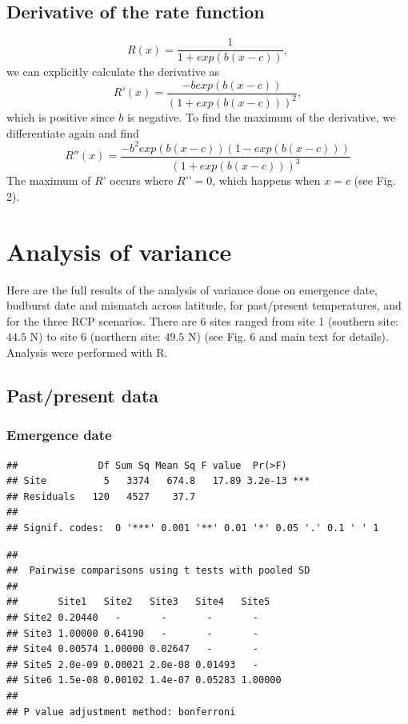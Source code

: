 \documentclass[12 pt]{article}
\begin{document}
\subsection*{Derivative of the rate function}
\begin{equation}
    R(x)=\frac{1}{1+exp(b(x-c))}, \tag*{Eq. S\theequation}
\end{equation}
we can explicitly calculate the derivative as
\begin{equation}
    R'(x)=\frac{-b exp(b(x-c))}{(1+exp(b(x-c)))^2}, \tag*{Eq. S\theequation}
\end{equation}
which is positive since $b$ is negative. To find the maximum of the derivative, we differentiate again and find
\begin{equation}
    R''(x) = \frac{-b^2 exp(b(x-c))(1-exp(b(x-c)))}{(1+exp(b(x-c)))^3} \tag*{Eq. S\theequation}
\end{equation}
The maximum of $R’$ occurs where $R’’ = 0$, which happens when $x = c$ (see Fig. 2).

\section{Analysis of variance}
Here are the full results of the analysis of variance done on emergence date, budburst date and mismatch across latitude, for past/present temperatures, and for the three RCP scenarios. There are $6$ sites ranged from site 1 (southern site: $44.5$ N) to site 6 (northern site: $49.5$ N) (see Fig. 6 and main text for details). Analysis were performed with R.
\subsection{Past/present data}
\subsubsection*{Emergence date}

\begin{verbatim}
##              Df Sum Sq Mean Sq F value  Pr(>F)    
## Site          5   3374   674.8   17.89 3.2e-13 ***
## Residuals   120   4527    37.7                    
## 
## Signif. codes:  0 '***' 0.001 '**' 0.01 '*' 0.05 '.' 0.1 ' ' 1
\end{verbatim}

\begin{verbatim}
## 
##  Pairwise comparisons using t tests with pooled SD 
## 
##       Site1   Site2   Site3   Site4   Site5  
## Site2 0.20440   -       -       -       -      
## Site3 1.00000 0.64190   -       -       -      
## Site4 0.00574 1.00000 0.02647   -       -      
## Site5 2.0e-09 0.00021 2.0e-08 0.01493   -      
## Site6 1.5e-08 0.00102 1.4e-07 0.05283 1.00000
## 
## P value adjustment method: bonferroni
\end{verbatim}
\end{document}
